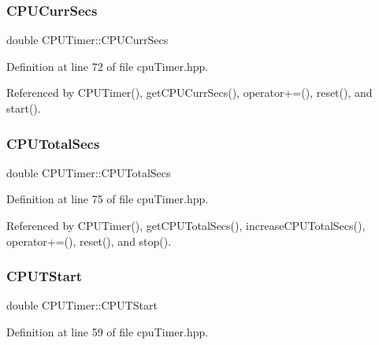 \subsubsection{\texorpdfstring{C\+P\+U\+Curr\+Secs}{CPUCurrSecs}}
{\footnotesize\ttfamily double C\+P\+U\+Timer\+::\+C\+P\+U\+Curr\+Secs\hspace{0.3cm}{\ttfamily [private]}}



Definition at line 72 of file cpu\+Timer.\+hpp.



Referenced by C\+P\+U\+Timer(), get\+C\+P\+U\+Curr\+Secs(), operator+=(), reset(), and start().

\mbox{\label{class_c_p_u_timer_a1f61a2313ec71eb67d658c482420abe7}} 
\subsubsection{\texorpdfstring{C\+P\+U\+Total\+Secs}{CPUTotalSecs}}
{\footnotesize\ttfamily double C\+P\+U\+Timer\+::\+C\+P\+U\+Total\+Secs\hspace{0.3cm}{\ttfamily [private]}}



Definition at line 75 of file cpu\+Timer.\+hpp.



Referenced by C\+P\+U\+Timer(), get\+C\+P\+U\+Total\+Secs(), increase\+C\+P\+U\+Total\+Secs(), operator+=(), reset(), and stop().

\mbox{\label{class_c_p_u_timer_a0248a7ebc1ed9fb9bcd4f63f07f9f984}} 
\subsubsection{\texorpdfstring{C\+P\+U\+T\+Start}{CPUTStart}}
{\footnotesize\ttfamily double C\+P\+U\+Timer\+::\+C\+P\+U\+T\+Start\hspace{0.3cm}{\ttfamily [private]}}



Definition at line 59 of file cpu\+Timer.\+hpp.



